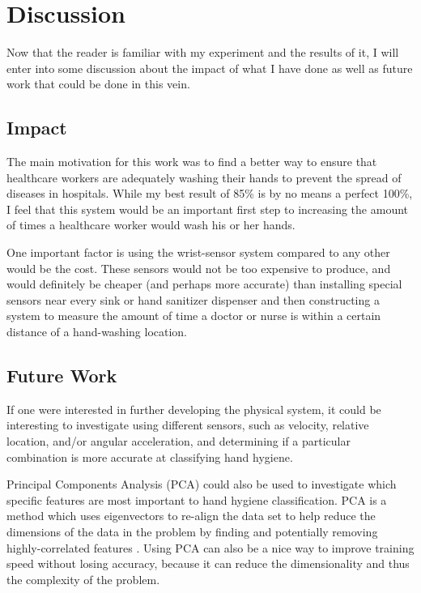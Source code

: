 \documentclass[]{report}
\begin{document}
\chapter{Discussion}

Now that the reader is familiar with my experiment and the results of it, I will enter into some discussion about the impact of what I have done as well as future work that could be done in this vein.

\section{Impact}

The main motivation for this work was to find a better way to ensure that healthcare workers are adequately washing their hands to prevent the spread of diseases in hospitals. While my best result of 85\% is by no means a perfect 100\%, I feel that this system would be an important first step to increasing the amount of times a healthcare worker would wash his or her hands.

One important factor is using the wrist-sensor system compared to any other would be the cost. These sensors would not be too expensive to produce, and would definitely be cheaper (and perhaps more accurate) than installing special sensors near every sink or hand sanitizer dispenser and then constructing a system to measure the amount of time a doctor or nurse is within a certain distance of a hand-washing location.

\section{Future Work}

If one were interested in further developing the physical system, it could be interesting to investigate using different sensors, such as velocity, relative location, and/or angular acceleration, and determining if a particular combination is more accurate at classifying hand hygiene. 

Principal Components Analysis (PCA) could also be used to investigate which specific features are most important to hand hygiene classification. PCA is a method which uses eigenvectors to re-align the data set to help reduce the dimensions of the data in the problem by finding and potentially removing highly-correlated features \cite{pca}. Using PCA can also be a nice way to improve training speed without losing accuracy, because it can reduce the dimensionality and thus the complexity of the problem.
\end{document}
